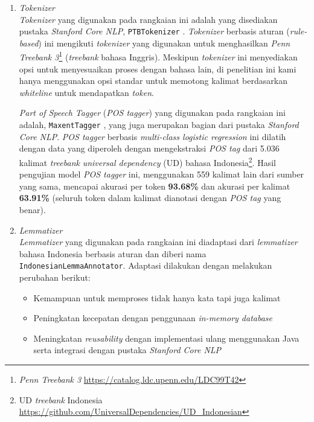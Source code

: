 \begin{enumerate}

\item \textit{Tokenizer} \\
\textit{Tokenizer} yang digunakan pada rangkaian ini adalah yang disediakan pustaka \textit{Stanford Core NLP}, \verb|PTBTokenizer| \citep{manningptbtokenizer}. \textit{Tokenizer} berbasis aturan (\textit{rule-based}) ini mengikuti \textit{tokenizer} yang digunakan untuk menghasilkan \textit{Penn Treebank 3}\footnote{\textit{Penn Treebank 3} \url{https://catalog.ldc.upenn.edu/LDC99T42}} (\textit{treebank} bahasa Inggris). Meskipun \textit{tokenizer} ini menyediakan opsi untuk menyesuaikan proses dengan bahasa lain, di penelitian ini kami hanya menggunakan opsi standar untuk memotong kalimat berdasarkan \textit{whiteline} untuk mendapatkan \textit{token}.

\textit{Part of Speech Tagger} (\textit{POS tagger}) yang digunakan pada rangkaian ini adalah, \verb|MaxentTagger| \citep{toutanova2003feature}, yang juga merupakan bagian dari pustaka \textit{Stanford Core NLP}. \textit{POS tagger} berbasis \textit{multi-class logistic regression} ini dilatih dengan data yang diperoleh dengan mengekstraksi \textit{POS tag} dari 5.036 kalimat \textit{treebank} \textit{universal dependency} (UD) bahasa Indonesia\footnote{UD \textit{treebank} Indonesia \url{https://github.com/UniversalDependencies/UD_Indonesian}}. Hasil pengujian model \textit{POS tagger} ini, menggunakan 559 kalimat lain dari sumber yang sama, mencapai akurasi per token \textbf{93.68\%} dan akurasi per kalimat \textbf{63.91\%} (seluruh token dalam kalimat dianotasi dengan \textit{POS tag} yang benar).

\item \textit{Lemmatizer} \\
\textit{Lemmatizer} yang digunakan pada rangkaian ini diadaptasi dari \textit{lemmatizer} bahasa Indonesia berbasis aturan \citep{suhartono2014lemmatization} dan diberi nama \verb|IndonesianLemmaAnnotator|. Adaptasi dilakukan dengan melakukan perubahan berikut:

\begin{itemize}
\item Kemampuan untuk memproses tidak hanya kata tapi juga kalimat
\item Peningkatan kecepatan dengan penggunaan \textit{in-memory database}
\item Meningkatan \textit{reusability} dengan implementasi ulang menggunakan Java serta integrasi dengan pustaka \textit{Stanford Core NLP}
\end{itemize}


\end{enumerate}
